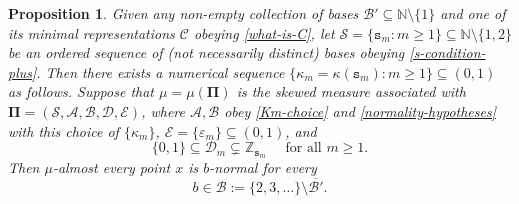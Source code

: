 \documentclass[12pt, twoside]{article}
\newtheorem{proposition}[theorem]{Proposition}
\theoremstyle{definition}
\numberwithin{equation}{section}
\begin{document}
\begin{proposition} \label{normal-prop}
Given any non-empty collection of bases $\mathscr{B}' \subseteq \mathbb N \setminus \{1\}$ and one of its minimal representations $\mathscr{C}$ obeying \eqref{what-is-C}, let $\mathcal S = \{\mathtt s_m : m \geq 1\} \subseteq \mathbb N \setminus \{1,2\}$ be an ordered sequence of (not necessarily distinct) bases obeying \eqref{s-condition-plus}.
Then there exists a numerical sequence $\{\kappa_m = \kappa (\mathtt s_m): m \geq 1\} \subseteq (0,1)$ as follows.  
\vskip0.1in 
\noindent Suppose that $\mu = \mu(\pmb{\Pi})$ is the skewed measure associated with $\pmb{\Pi} = (\mathcal S, \mathcal A, \mathcal B, \mathcal D, \mathcal E)$, where $\mathcal A, \mathcal B$ obey \eqref{Km-choice} and \eqref{normality-hypotheses} with this choice of $\{\kappa_m\}$, $\mathcal E = \{\varepsilon_m \} \subseteq (0, 1)$, and  
\begin{equation} \label{normality-digit-01} 
\{0, 1\} \subseteq \mathscr{D}_m \subsetneq \mathbb Z_{\mathtt s_m} \quad \text{ for all } m \geq 1.
\end{equation}
Then  $\mu$-almost every point $x$ is $b$-normal for every
\begin{equation} \label{bases-BC-bar}
b \in \mathscr{B} := \{2, 3, \ldots\} \setminus \overline{\mathscr B'}.
\end{equation} 
\end{proposition} 
\end{document}
